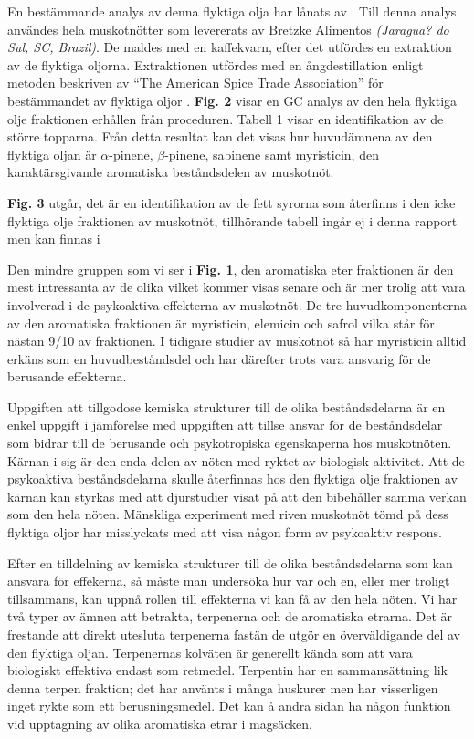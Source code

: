 \documentclass[a4paper,margin=3.25cm]{article}
\begin{document}
En bestämmande analys av denna flyktiga olja har lånats av \cite{spricigo1999extraction}.
Till denna analys användes hela muskotnötter som levererats av Bretzke Alimentos \textit{(Jaragua? do Sul, SC, Brazil)}. De maldes med en kaffekvarn, efter det utfördes
en extraktion av de flyktiga oljorna. Extraktionen utfördes med en ångdestillation enligt metoden beskriven av ``The American Spice Trade Association'' för bestämmandet av flyktiga oljor
\cite[citerad av Ferreira]{spricigo1999extraction}.
\textbf{Fig. 2} visar en GC analys av den hela flyktiga olje fraktionen erhållen
från proceduren. Tabell 1 visar en identifikation av de större topparna.
Från detta resultat kan det visas hur huvudämnena av den flyktiga oljan är $\alpha$-pinene, $\beta$-pinene, sabinene samt myristicin, den karaktärsgivande aromatiska beståndsdelen av muskotnöt.

\textbf{Fig. 3} utgår, det är en identifikation av de fett syrorna som återfinns i den icke flyktiga olje fraktionen av muskotnöt, tillhörande tabell ingår ej i denna rapport men kan finnas i \cite[s.258]{spricigo1999extraction}

Den mindre gruppen som vi ser i \textbf{Fig. 1}, den aromatiska
eter fraktionen är den mest intressanta av de olika vilket kommer visas senare
och är mer trolig att vara involverad i de psykoaktiva effekterna av
muskotnöt.
De tre huvudkomponenterna av den aromatiska fraktionen är myristicin, elemicin
och safrol vilka står för nästan 9/10 av fraktionen.
I tidigare studier av muskotnöt så har myristicin alltid erkäns som en
huvudbeståndsdel och har därefter trots vara ansvarig för de berusande effekterna.

Uppgiften att tillgodose kemiska strukturer till de olika beståndsdelarna är
en enkel uppgift i jämförelse med uppgiften att tillse ansvar för de
beståndsdelar som bidrar till de berusande och psykotropiska egenskaperna hos muskotnöten.
Kärnan i sig är den enda delen av nöten med ryktet av biologisk aktivitet.
Att de psykoaktiva beståndsdelarna skulle återfinnas hos den flyktiga olje fraktionen av kärnan kan styrkas med att djurstudier visat på att den bibehåller samma verkan som den hela nöten.
Mänskliga experiment med riven muskotnöt tömd på dess flyktiga oljor har
misslyckats med att visa någon form av psykoaktiv respons. \cite{truitt}

Efter en tilldelning av kemiska strukturer till de olika beståndsdelarna
som kan ansvara för effekerna, så måste man undersöka hur var och en, eller
mer troligt tillsammans, kan uppnå rollen till
effekterna vi kan få av den hela nöten.
Vi har två typer av ämnen att betrakta, terpenerna och de aromatiska etrarna.
Det är frestande att direkt utesluta terpenerna fastän de utgör en överväldigande
del av den flyktiga oljan. Terpenernas kolväten är generellt kända som att vara
biologiskt effektiva endast som retmedel.
Terpentin har en sammansättning lik denna terpen fraktion; det har använts
i många huskurer men har visserligen inget rykte som ett berusningsmedel.
Det kan å andra sidan ha någon funktion vid upptagning av olika aromatiska etrar i
magsäcken.
\end{document}
